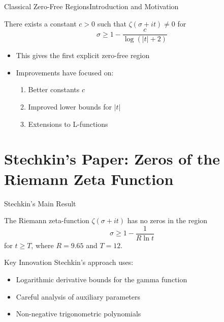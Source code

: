 \documentclass{beamer}
\begin{document}
\begin{frame}{Classical Zero-Free Regions}{Introduction and Motivation}
\begin{theorem}
There exists a constant $c > 0$ such that $\zeta(\sigma + it) \neq 0$ for 
$$\sigma \geq 1 - \frac{c}{\log(|t| + 2)}$$
\end{theorem}

\vspace{0.5cm}

\begin{itemize}
\item This gives the first explicit zero-free region
\item Improvements have focused on:
  \begin{enumerate}
  \item Better constants $c$
  \item Improved lower bounds for $|t|$
  \item Extensions to L-functions
  \end{enumerate}
\end{itemize}
\end{frame}

\section{Stechkin's Paper: Zeros of the Riemann Zeta Function}

\begin{frame}{Stechkin's Main Result}
\begin{theorem}[Stechkin, 1970]
The Riemann zeta-function $\zeta(\sigma + it)$ has no zeros in the region
$$\sigma \geq 1 - \frac{1}{R \ln t}$$
for $t \geq T$, where $R = 9.65$ and $T = 12$.
\end{theorem}

\vspace{0.5cm}

\begin{block}{Key Innovation}
Stechkin's approach uses:
\begin{itemize}
\item Logarithmic derivative bounds for the gamma function
\item Careful analysis of auxiliary parameters
\item Non-negative trigonometric polynomials
\end{itemize}
\end{block}
\end{frame}
\end{document}
